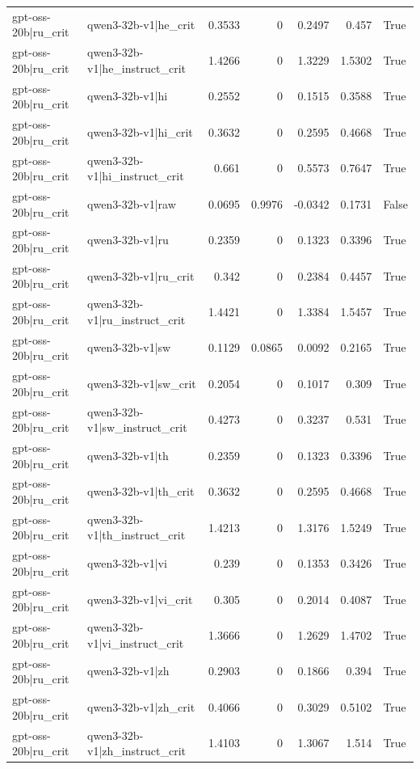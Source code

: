 \begin{table}
\begin{tabular}{l l r r r r l}
gpt-oss-20b|ru_crit & qwen3-32b-v1|he_crit & 0.3533 & 0 & 0.2497 & 0.457 & True \\
gpt-oss-20b|ru_crit & qwen3-32b-v1|he_instruct_crit & 1.4266 & 0 & 1.3229 & 1.5302 & True \\
gpt-oss-20b|ru_crit & qwen3-32b-v1|hi & 0.2552 & 0 & 0.1515 & 0.3588 & True \\
gpt-oss-20b|ru_crit & qwen3-32b-v1|hi_crit & 0.3632 & 0 & 0.2595 & 0.4668 & True \\
gpt-oss-20b|ru_crit & qwen3-32b-v1|hi_instruct_crit & 0.661 & 0 & 0.5573 & 0.7647 & True \\
gpt-oss-20b|ru_crit & qwen3-32b-v1|raw & 0.0695 & 0.9976 & -0.0342 & 0.1731 & False \\
gpt-oss-20b|ru_crit & qwen3-32b-v1|ru & 0.2359 & 0 & 0.1323 & 0.3396 & True \\
gpt-oss-20b|ru_crit & qwen3-32b-v1|ru_crit & 0.342 & 0 & 0.2384 & 0.4457 & True \\
gpt-oss-20b|ru_crit & qwen3-32b-v1|ru_instruct_crit & 1.4421 & 0 & 1.3384 & 1.5457 & True \\
gpt-oss-20b|ru_crit & qwen3-32b-v1|sw & 0.1129 & 0.0865 & 0.0092 & 0.2165 & True \\
gpt-oss-20b|ru_crit & qwen3-32b-v1|sw_crit & 0.2054 & 0 & 0.1017 & 0.309 & True \\
gpt-oss-20b|ru_crit & qwen3-32b-v1|sw_instruct_crit & 0.4273 & 0 & 0.3237 & 0.531 & True \\
gpt-oss-20b|ru_crit & qwen3-32b-v1|th & 0.2359 & 0 & 0.1323 & 0.3396 & True \\
gpt-oss-20b|ru_crit & qwen3-32b-v1|th_crit & 0.3632 & 0 & 0.2595 & 0.4668 & True \\
gpt-oss-20b|ru_crit & qwen3-32b-v1|th_instruct_crit & 1.4213 & 0 & 1.3176 & 1.5249 & True \\
gpt-oss-20b|ru_crit & qwen3-32b-v1|vi & 0.239 & 0 & 0.1353 & 0.3426 & True \\
gpt-oss-20b|ru_crit & qwen3-32b-v1|vi_crit & 0.305 & 0 & 0.2014 & 0.4087 & True \\
gpt-oss-20b|ru_crit & qwen3-32b-v1|vi_instruct_crit & 1.3666 & 0 & 1.2629 & 1.4702 & True \\
gpt-oss-20b|ru_crit & qwen3-32b-v1|zh & 0.2903 & 0 & 0.1866 & 0.394 & True \\
gpt-oss-20b|ru_crit & qwen3-32b-v1|zh_crit & 0.4066 & 0 & 0.3029 & 0.5102 & True \\
gpt-oss-20b|ru_crit & qwen3-32b-v1|zh_instruct_crit & 1.4103 & 0 & 1.3067 & 1.514 & True \\

\end{tabular}
\end{table}
